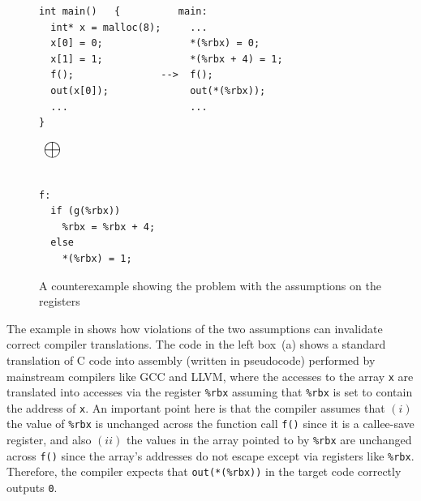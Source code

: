 \begin{figure}[t]
\hspace*{-2.7mm}
\begin{minipage}{0.70\textwidth}
\begin{Verbatim}[frame=single]
int main()   {          main:
  int* x = malloc(8);     ...
  x[0] = 0;               *(%rbx) = 0;
  x[1] = 1;               *(%rbx + 4) = 1;
  f();               -->  f();
  out(x[0]);              out(*(%rbx));
  ...                     ...
}
\end{Verbatim}
\end{minipage}
$\mbox{}~\mathlarger{\mathlarger{\mathlarger{\mathlarger{\mathlarger{\llink}}}}}~\mbox{}$
\\
\vspace{3mm}
\\
\hspace*{-2.7mm}
\begin{minipage}{0.33\textwidth}
\begin{Verbatim}[frame=single]
f:
  if (g(%rbx))
    %rbx = %rbx + 4;
  else
    *(%rbx) = 1;

\end{Verbatim}
\end{minipage}
\caption{A counterexample showing the problem with the assumptions on the registers}
\label{fig:reg-convention}
\end{figure}

%
The example in  shows how violations of the two
assumptions can invalidate correct compiler translations.
%
The code in the left box~(a) shows a standard translation of C code into assembly
(written in pseudocode) performed by mainstream compilers like GCC and LLVM, where the accesses to
the array \texttt{x} are translated into accesses via the register
\texttt{\%rbx} assuming that \texttt{\%rbx} is set to contain the
address of \texttt{x}. An important point here is that the compiler
assumes that $(i)$ the value of \texttt{\%rbx} is unchanged across
the function call \texttt{f()} since it is a callee-save register,
and also $(ii)$ the values in the array pointed to by \texttt{\%rbx} are
unchanged across \texttt{f()} since the array's addresses do not escape
except via \nip{} registers like \texttt{\%rbx}.
Therefore, the compiler expects that \texttt{out(*(\%rbx))} in the target code
correctly outputs \texttt{0}.

